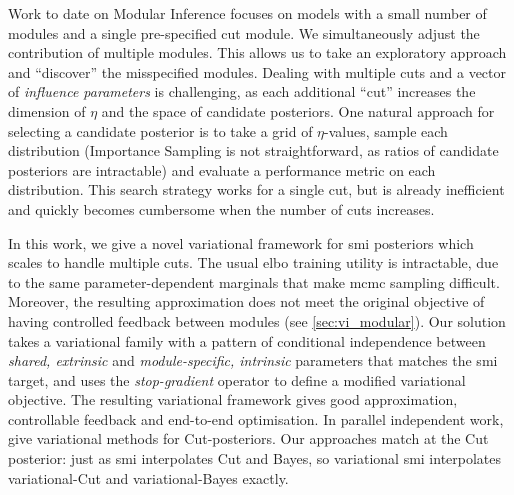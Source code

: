 Work to date on Modular Inference focuses on models with a small number of modules and a single pre-specified cut module.
We simultaneously adjust the contribution of multiple modules. This allows us to take an exploratory approach and ``discover'' the misspecified modules.
Dealing with multiple cuts and a vector of \emph{influence parameters} is challenging, as each additional ``cut'' increases the dimension of $\eta$ and the space of candidate posteriors.
One natural approach for selecting a candidate posterior is to take a grid of $\eta$-values, sample each distribution (Importance Sampling is not straightforward, as ratios of candidate posteriors are intractable) and evaluate a performance metric on each distribution.
This search strategy works for a single cut, but is already inefficient and quickly becomes cumbersome when the number of cuts increases.

In this work, we give a novel variational framework for \acrshort*{smi} posteriors
which scales to handle multiple cuts.
The usual \acrfull*{elbo} training utility is intractable, due to the same parameter-dependent marginals that make \acrshort*{mcmc} sampling difficult.
Moreover, the resulting approximation does not meet the original objective of having controlled feedback between modules (see \cref{sec:vi_modular}).
Our solution takes a variational family with a pattern of conditional independence  between \emph{shared, extrinsic} and \emph{module-specific, intrinsic} parameters that matches the \acrshort*{smi} target, and uses the \emph{stop-gradient} operator to define a modified variational objective. The resulting variational framework gives good approximation, controllable feedback and end-to-end optimisation.
In parallel independent work, \cite{Yu2021variationalcut} give variational methods for Cut-posteriors.
Our approaches match at the Cut posterior: just as \acrshort*{smi} interpolates Cut and Bayes, so variational \acrshort*{smi} interpolates variational-Cut and variational-Bayes exactly.



